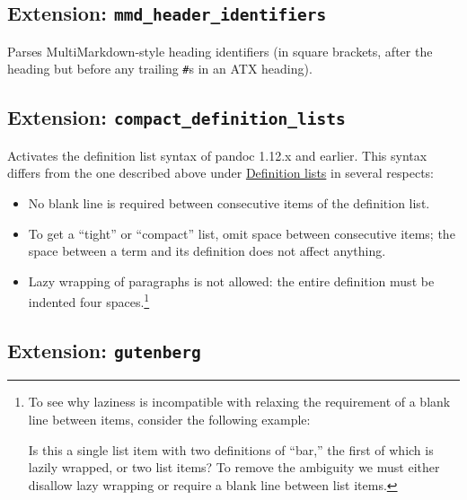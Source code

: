 \documentclass[
  b5paper
]{book}
\providecommand{\tightlist}{%
  \setlength{\itemsep}{0pt}\setlength{\parskip}{0pt}}
\begin{document}
\subsection{\texorpdfstring{Extension:
\texttt{mmd\_header\_identifiers}}{Extension: mmd\_header\_identifiers}}\label{extension-mmd_header_identifiers}

Parses MultiMarkdown-style heading identifiers (in square brackets,
after the heading but before any trailing \texttt{\#}s in an ATX
heading).

\subsection{\texorpdfstring{Extension:
\texttt{compact\_definition\_lists}}{Extension: compact\_definition\_lists}}\label{extension-compact_definition_lists}

Activates the definition list syntax of pandoc 1.12.x and earlier. This
syntax differs from the one described above under
\hyperref[definition-lists]{Definition lists} in several respects:

\begin{itemize}
\tightlist
\item
  No blank line is required between consecutive items of the definition
  list.
\item
  To get a ``tight'' or ``compact'' list, omit space between consecutive
  items; the space between a term and its definition does not affect
  anything.
\item
  Lazy wrapping of paragraphs is not allowed: the entire definition must
  be indented four spaces.\footnote{To see why laziness is incompatible
    with relaxing the requirement of a blank line between items,
    consider the following example:


    Is this a single list item with two definitions of ``bar,'' the
    first of which is lazily wrapped, or two list items? To remove the
    ambiguity we must either disallow lazy wrapping or require a blank
    line between list items.}
\end{itemize}

\subsection{\texorpdfstring{Extension:
\texttt{gutenberg}}{Extension: gutenberg}}\label{extension-gutenberg}
\end{document}
